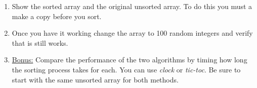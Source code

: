 \documentclass[11pt]{article}
\begin{document}
\begin{description}
\begin{enumerate}
                \item Show the sorted array and the original unsorted array. To do this you must a make a copy before you sort.\\
                
		\item Once you have it working change the array to 100 random integers and verify that is still works.		\\              

                \item \underline{Bonus:} Compare the performance of the two algorithms by timing how long the sorting process takes for each. You can use {\it clock} or {\it tic-toc}. Be sure to start with the same unsorted array for both methods.  
            \end{enumerate}


    \end{description}
 
\newpage
\end{document}

